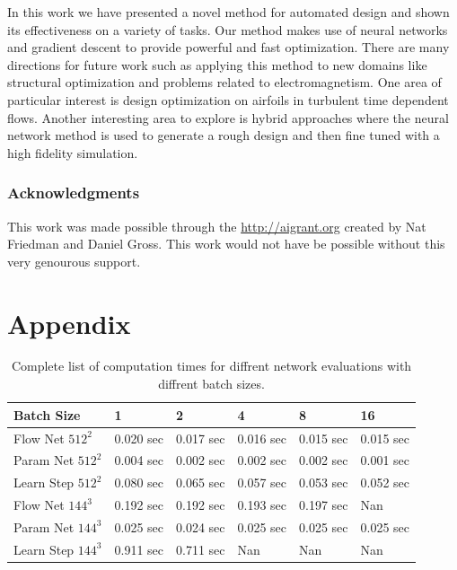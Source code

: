 \documentclass{article} %
\begin{document}
In this work we have presented a novel method for automated design and shown its effectiveness on a variety of tasks. Our method makes use of neural networks and gradient descent to provide powerful and fast optimization. There are many directions for future work such as applying this method to new domains like structural optimization and problems related to electromagnetism. One area of particular interest is design optimization on airfoils in turbulent time dependent flows. Another interesting area to explore is hybrid approaches where the neural network method is used to generate a rough design and then fine tuned with a high fidelity simulation.


\subsubsection*{Acknowledgments}

This work was made possible through the \url{http://aigrant.org} created by Nat Friedman and Daniel Gross. This work would not have be possible without this very genourous support.




\section{Appendix}



\begin{table}[!h]
\caption{Complete list of computation times for diffrent network evaluations with diffrent batch sizes.}
\label{computation_table}
\begin{center}
\begin{tabular}{l|lllll}
Batch Size & 1 & 2 & 4 & 8 & 16 \\ \hline 
Flow Net $512^2$ & 0.020 sec & 0.017 sec & 0.016 sec & 0.015 sec & 0.015 sec \\ 
Param Net $512^2$ & 0.004 sec & 0.002 sec & 0.002 sec & 0.002 sec & 0.001 sec \\ 
Learn Step $512^2$ & 0.080 sec & 0.065 sec & 0.057 sec & 0.053 sec & 0.052 sec \\ 
Flow Net $144^3$ & 0.192 sec & 0.192 sec & 0.193 sec & 0.197 sec & Nan \\ 
Param Net $144^3$ & 0.025 sec & 0.024 sec & 0.025 sec & 0.025 sec & 0.025 sec \\ 
Learn Step $144^3$ & 0.911 sec & 0.711 sec & Nan & Nan & Nan \\ 
\end{tabular}
\end{center}
\end{table}
\end{document}
